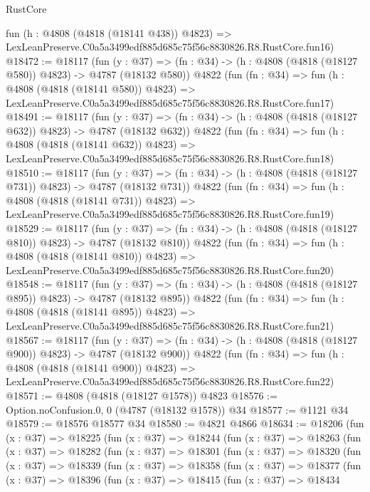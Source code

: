 \begin{lexlean}{RustCore}
\begin{coremodule}
    fun (h : @4808 (@4818 (@18141 @438)) @4823) =>
    LexLeanPreserve.C0a5a3499edf885d685c75f56c8830826.R8.RustCore.fun16)
@18472 := @18117
    (fun (y : @37) => (fn : @34) -> (h : @4808 (@4818 (@18127 @580)) @4823) -> @4787 (@18132 @580))
    @4822
    (fun (fn : @34) =>
    fun (h : @4808 (@4818 (@18141 @580)) @4823) =>
    LexLeanPreserve.C0a5a3499edf885d685c75f56c8830826.R8.RustCore.fun17)
@18491 := @18117
    (fun (y : @37) => (fn : @34) -> (h : @4808 (@4818 (@18127 @632)) @4823) -> @4787 (@18132 @632))
    @4822
    (fun (fn : @34) =>
    fun (h : @4808 (@4818 (@18141 @632)) @4823) =>
    LexLeanPreserve.C0a5a3499edf885d685c75f56c8830826.R8.RustCore.fun18)
@18510 := @18117
    (fun (y : @37) => (fn : @34) -> (h : @4808 (@4818 (@18127 @731)) @4823) -> @4787 (@18132 @731))
    @4822
    (fun (fn : @34) =>
    fun (h : @4808 (@4818 (@18141 @731)) @4823) =>
    LexLeanPreserve.C0a5a3499edf885d685c75f56c8830826.R8.RustCore.fun19)
@18529 := @18117
    (fun (y : @37) => (fn : @34) -> (h : @4808 (@4818 (@18127 @810)) @4823) -> @4787 (@18132 @810))
    @4822
    (fun (fn : @34) =>
    fun (h : @4808 (@4818 (@18141 @810)) @4823) =>
    LexLeanPreserve.C0a5a3499edf885d685c75f56c8830826.R8.RustCore.fun20)
@18548 := @18117
    (fun (y : @37) => (fn : @34) -> (h : @4808 (@4818 (@18127 @895)) @4823) -> @4787 (@18132 @895))
    @4822
    (fun (fn : @34) =>
    fun (h : @4808 (@4818 (@18141 @895)) @4823) =>
    LexLeanPreserve.C0a5a3499edf885d685c75f56c8830826.R8.RustCore.fun21)
@18567 := @18117
    (fun (y : @37) => (fn : @34) -> (h : @4808 (@4818 (@18127 @900)) @4823) -> @4787 (@18132 @900))
    @4822
    (fun (fn : @34) =>
    fun (h : @4808 (@4818 (@18141 @900)) @4823) =>
    LexLeanPreserve.C0a5a3499edf885d685c75f56c8830826.R8.RustCore.fun22)
@18571 := @4808 (@4818 (@18127 @1578)) @4823
@18576 := Option.noConfusion.{0, 0} (@4787 (@18132 @1578)) @34
@18577 := @1121 @34
@18579 := @18576 @18577 @34
@18580 := @4821 @4866
@18634 := @18206
    (fun (x : @37) =>
    @18225
      (fun (x : @37) =>
      @18244
        (fun (x : @37) =>
        @18263
          (fun (x : @37) =>
          @18282
            (fun (x : @37) =>
            @18301
              (fun (x : @37) =>
              @18320
                (fun (x : @37) =>
                @18339
                  (fun (x : @37) =>
                  @18358
                    (fun (x : @37) =>
                    @18377
                      (fun (x : @37) =>
                      @18396
                        (fun (x : @37) =>
                        @18415
                          (fun (x : @37) =>
                          @18434

\end{coremodule}
\end{lexlean}
